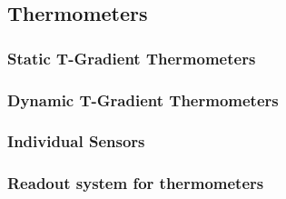 \subsection{Thermometers}
\label{sec:fdsp-slow-cryo-therm}


\subsubsection{Static T-Gradient Thermometers}

\subsubsection{Dynamic T-Gradient Thermometers}

\subsubsection{Individual Sensors}

\subsubsection{Readout system for thermometers}

